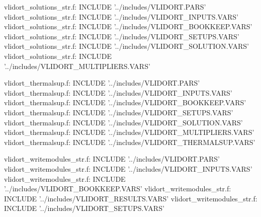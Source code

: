 vlidort_solutions_str.f:      INCLUDE '../includes/VLIDORT.PARS'
vlidort_solutions_str.f:      INCLUDE '../includes/VLIDORT_INPUTS.VARS'
vlidort_solutions_str.f:      INCLUDE '../includes/VLIDORT_BOOKKEEP.VARS'
vlidort_solutions_str.f:      INCLUDE '../includes/VLIDORT_SETUPS.VARS'
vlidort_solutions_str.f:      INCLUDE '../includes/VLIDORT_SOLUTION.VARS'
vlidort_solutions_str.f:      INCLUDE '../includes/VLIDORT_MULTIPLIERS.VARS'

vlidort_thermalsup.f:      INCLUDE '../includes/VLIDORT.PARS'
vlidort_thermalsup.f:      INCLUDE '../includes/VLIDORT_INPUTS.VARS'
vlidort_thermalsup.f:      INCLUDE '../includes/VLIDORT_BOOKKEEP.VARS'
vlidort_thermalsup.f:      INCLUDE '../includes/VLIDORT_SETUPS.VARS'
vlidort_thermalsup.f:      INCLUDE '../includes/VLIDORT_SOLUTION.VARS'
vlidort_thermalsup.f:      INCLUDE '../includes/VLIDORT_MULTIPLIERS.VARS'
vlidort_thermalsup.f:      INCLUDE '../includes/VLIDORT_THERMALSUP.VARS'

vlidort_writemodules_str.f:      INCLUDE '../includes/VLIDORT.PARS'
vlidort_writemodules_str.f:      INCLUDE '../includes/VLIDORT_INPUTS.VARS'
vlidort_writemodules_str.f:      INCLUDE '../includes/VLIDORT_BOOKKEEP.VARS'
vlidort_writemodules_str.f:      INCLUDE '../includes/VLIDORT_RESULTS.VARS'
vlidort_writemodules_str.f:      INCLUDE '../includes/VLIDORT_SETUPS.VARS'
